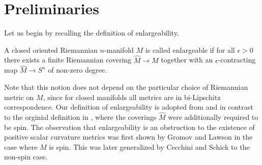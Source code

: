 \section{Preliminaries}


Let us begin by recalling the definition of enlargeability.

\begin{definition}
    A closed oriented Riemannian $n$-manifold $M$ is called enlargeable if for all $\epsilon >0$ there exists a finite Riemannian covering $\hat{M} \to M$ together with an $\epsilon$-contracting  map $\hat{M} \to S^n$ of non-zero degree.
\end{definition}


Note that this notion does not depend on the particular choice of Riemannian metric on $M$, since for closed manifolds all metrics are in bi-Lipschitz correspondence. Our definition of enlargeability is adopted from \cite{cecchini2021enlargeable} and \cite{HankeSchick} in contrast to the orginial definition in \cite{gromov1980spin}, where the coverings $\hat{M}$ were additionally required to be spin. The observation that enlargeability is an obstruction to the existence of positive scalar curvature metrics was first shown by Gromov and Lawson \cite{gromov1980spin} in the case where $M$ is spin. This was later generalized by Cecchini and Schick \cite{cecchini2021enlargeable} to the non-spin case.

